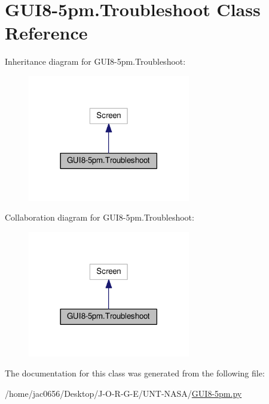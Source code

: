 \hypertarget{classGUI8-5pm_1_1Troubleshoot}{}\section{G\+U\+I8-\/5pm.Troubleshoot Class Reference}
\label{classGUI8-5pm_1_1Troubleshoot}


Inheritance diagram for G\+U\+I8-\/5pm.Troubleshoot\+:
\nopagebreak
\begin{figure}[H]
\begin{center}
\leavevmode
\includegraphics[width=201pt]{classGUI8-5pm_1_1Troubleshoot__inherit__graph}
\end{center}
\end{figure}


Collaboration diagram for G\+U\+I8-\/5pm.Troubleshoot\+:
\nopagebreak
\begin{figure}[H]
\begin{center}
\leavevmode
\includegraphics[width=201pt]{classGUI8-5pm_1_1Troubleshoot__coll__graph}
\end{center}
\end{figure}


The documentation for this class was generated from the following file\+:\begin{DoxyCompactItemize}
\item 
/home/jac0656/\+Desktop/\+J-\/\+O-\/\+R-\/\+G-\/\+E/\+U\+N\+T-\/\+N\+A\+S\+A/\hyperlink{GUI8-5pm_8py}{G\+U\+I8-\/5pm.\+py}\end{DoxyCompactItemize}
